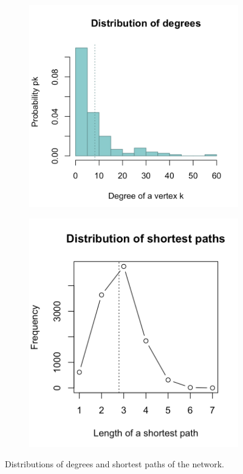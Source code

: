 \begin{figure}
    \centering
    \begin{subfigure}[c]{0.45\textwidth}
    \includegraphics[scale=0.4]{plots/degreedistribution.png}
    \end{subfigure}
    \begin{subfigure}[c]{0.45\textwidth}
    \includegraphics[scale=0.4]{plots/shortestpaths.png}
    \end{subfigure}
    \caption{Distributions of degrees and shortest paths of the network.}
    \label{fig:plots1}
\end{figure}

